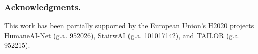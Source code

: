 \documentclass[runningheads]{llncs}
\begin{document}






%









\subsubsection*{Acknowledgments.} This work has been partially
supported by the European Union’s H2020 projects HumaneAI-Net (g.a.
952026), StairwAI (g.a. 101017142), and TAILOR (g.a. 952215).


% 
%
% 
%
% 
%
% 
%
%
% 

%
%
%
 
 
%
\end{document}

